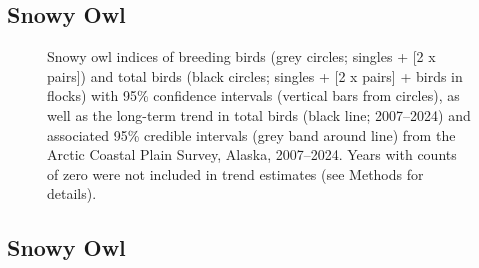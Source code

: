 \documentclass[
]{article}
\begin{document}
\newpage{}

\subsection*{Snowy Owl}\label{snowy-owl}

\begin{figure}


\caption{\label{fig-SNOW}Snowy owl indices of breeding birds (grey
circles; singles + {[}2 x pairs{]}) and total birds (black circles;
singles + {[}2 x pairs{]} + birds in flocks) with 95\% confidence
intervals (vertical bars from circles), as well as the long-term trend
in total birds (black line; 2007--2024) and associated 95\% credible
intervals (grey band around line) from the Arctic Coastal Plain Survey,
Alaska, 2007--2024. Years with counts of zero were not included in trend
estimates (see Methods for details).}

\end{figure}%

\newpage{}

\subsection*{Snowy Owl}\label{snowy-owl-1}

\begingroup\fontsize{10}{12}\selectfont
\end{document}
